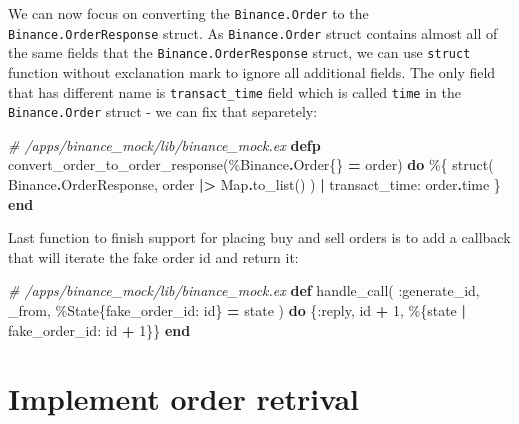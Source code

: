 \documentclass[
]{book}
\newenvironment{Shaded}{\begin{snugshade}}{\end{snugshade}}
\newcommand{\CommentTok}[1]{\textcolor[rgb]{0.56,0.35,0.01}{\textit{#1}}}
\newcommand{\ConstantTok}[1]{\textcolor[rgb]{0.00,0.00,0.00}{#1}}
\newcommand{\DecValTok}[1]{\textcolor[rgb]{0.00,0.00,0.81}{#1}}
\newcommand{\KeywordTok}[1]{\textcolor[rgb]{0.13,0.29,0.53}{\textbf{#1}}}
\newcommand{\NormalTok}[1]{#1}
\newcommand{\OperatorTok}[1]{\textcolor[rgb]{0.81,0.36,0.00}{\textbf{#1}}}
\newcommand{\VariableTok}[1]{\textcolor[rgb]{0.00,0.00,0.00}{#1}}
\begin{document}
We can now focus on converting the \texttt{Binance.Order} to the \texttt{Binance.OrderResponse} struct. As \texttt{Binance.Order} struct contains almost all of the same fields that the \texttt{Binance.OrderResponse} struct, we can use \texttt{struct} function without exclanation mark to ignore all additional fields. The only field that has different name is \texttt{transact\_time} field which is called \texttt{time} in the \texttt{Binance.Order} struct - we can fix that separetely:

\begin{Shaded}
\begin{Highlighting}[]
\CommentTok{\# /apps/binance\_mock/lib/binance\_mock.ex}
  \KeywordTok{defp}\NormalTok{ convert\_order\_to\_order\_response(\%}\ConstantTok{Binance}\OperatorTok{.}\ConstantTok{Order}\NormalTok{\{\} }\OperatorTok{=}\NormalTok{ order) }\KeywordTok{do}
\NormalTok{    \%\{}
\NormalTok{      struct(}
        \ConstantTok{Binance}\OperatorTok{.}\ConstantTok{OrderResponse}\NormalTok{,}
\NormalTok{        order }\OperatorTok{|\textgreater{}} \ConstantTok{Map}\OperatorTok{.}\NormalTok{to\_list()}
\NormalTok{      )}
      \OperatorTok{|} \VariableTok{transact\_time:}\NormalTok{ order}\OperatorTok{.}\NormalTok{time}
\NormalTok{    \}}
  \KeywordTok{end}
\end{Highlighting}
\end{Shaded}

Last function to finish support for placing buy and sell orders is to add a callback that will iterate the fake order id and return it:

\begin{Shaded}
\begin{Highlighting}[]
\CommentTok{\# /apps/binance\_mock/lib/binance\_mock.ex}
  \KeywordTok{def}\NormalTok{ handle\_call(}
        \VariableTok{:generate\_id}\NormalTok{,}
\NormalTok{        \_from,}
\NormalTok{        \%}\ConstantTok{State}\NormalTok{\{}\VariableTok{fake\_order\_id:}\NormalTok{ id\} }\OperatorTok{=}\NormalTok{ state}
\NormalTok{      ) }\KeywordTok{do}
\NormalTok{    \{}\VariableTok{:reply}\NormalTok{, id }\OperatorTok{+} \DecValTok{1}\NormalTok{, \%\{state }\OperatorTok{|} \VariableTok{fake\_order\_id:}\NormalTok{ id }\OperatorTok{+} \DecValTok{1}\NormalTok{\}\}}
  \KeywordTok{end}
\end{Highlighting}
\end{Shaded}

\hypertarget{implement-order-retrival}{%
\section{Implement order retrival}\label{implement-order-retrival}}
\end{document}
